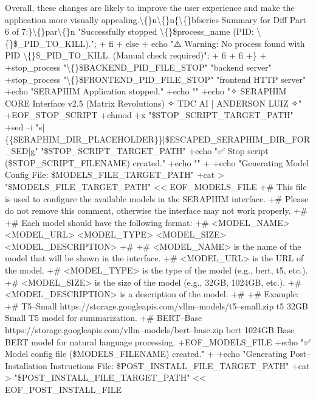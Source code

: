 \documentclass{article}
\begin{document}
{Overall, these changes are likely to improve the user experience and make the application more visually appealing.\textbackslash\{\}n\textbackslash\{\}n\{\textbackslash\{\}bfseries Summary for Diff Part 6 of 7:\}\textbackslash\{\}par\textbackslash\{\}n  "Successfully stopped \textbackslash\{\}\$process\_name (PID: \textbackslash\{\}\$\_PID\_TO\_KILL)."; 
+            fi
+        else
+            echo "⚠️ Warning: No process found with PID \textbackslash\{\}\$\_PID\_TO\_KILL. (Manual check required)"; 
+        fi
+    fi
+\}
+
+stop\_process "\textbackslash\{\}\$BACKEND\_PID\_FILE\_STOP" "backend server"
+stop\_process "\textbackslash\{\}\$FRONTEND\_PID\_FILE\_STOP" "frontend HTTP server"
+echo "SERAPHIM Application stopped."
+echo ""
+echo "✧ SERAPHIM CORE Interface v2.5 (Matrix Revolutions) ✧ TDC AI | ANDERSON LUIZ ✧"
+EOF\_STOP\_SCRIPT
+chmod +x "\$STOP\_SCRIPT\_TARGET\_PATH"
+sed --i "s|\{\{SERAPHIM\_DIR\_PLACEHOLDER\}\}|\$ESCAPED\_SERAPHIM\_DIR\_FOR\_SED|g" "\$STOP\_SCRIPT\_TARGET\_PATH"
+echo "✅ Stop script (\$STOP\_SCRIPT\_FILENAME) created."
+echo ""
+
+echo "Generating Model Config File: \$MODELS\_FILE\_TARGET\_PATH"
+cat \textgreater{} "\$MODELS\_FILE\_TARGET\_PATH" \textless{}\textless{} EOF\_MODELS\_FILE
+\# This file is used to configure the available models in the SERAPHIM interface.
+\# Please do not remove this comment, otherwise the interface may not work properly.
+\#
+\# Each model should have the following format:
+\# \textless{}MODEL\_NAME\textgreater{} \textless{}MODEL\_URL\textgreater{} \textless{}MODEL\_TYPE\textgreater{} \textless{}MODEL\_SIZE\textgreater{} \textless{}MODEL\_DESCRIPTION\textgreater{}
+\#
+\# \textless{}MODEL\_NAME\textgreater{} is the name of the model that will be shown in the interface.
+\# \textless{}MODEL\_URL\textgreater{} is the URL of the model.
+\# \textless{}MODEL\_TYPE\textgreater{} is the type of the model (e.g., bert, t5, etc.).
+\# \textless{}MODEL\_SIZE\textgreater{} is the size of the model (e.g., 32GB, 1024GB, etc.).
+\# \textless{}MODEL\_DESCRIPTION\textgreater{} is a description of the model.
+\#
+\# Example:
+\# T5--Small  https://storage.googleapis.com/vllm--models/t5--small.zip  t5  32GB  Small T5 model for summarization.
+\# BERT--Base https://storage.googleapis.com/vllm--models/bert--base.zip  bert  1024GB  Base BERT model for natural language processing.
+EOF\_MODELS\_FILE
+echo "✅ Model config file (\$MODELS\_FILENAME) created."
+
+echo "Generating Post--Installation Instructions File: \$POST\_INSTALL\_FILE\_TARGET\_PATH"
+cat \textgreater{} "\$POST\_INSTALL\_FILE\_TARGET\_PATH" \textless{}\textless{} EOF\_POST\_INSTALL\_FILE
}
\end{document}
